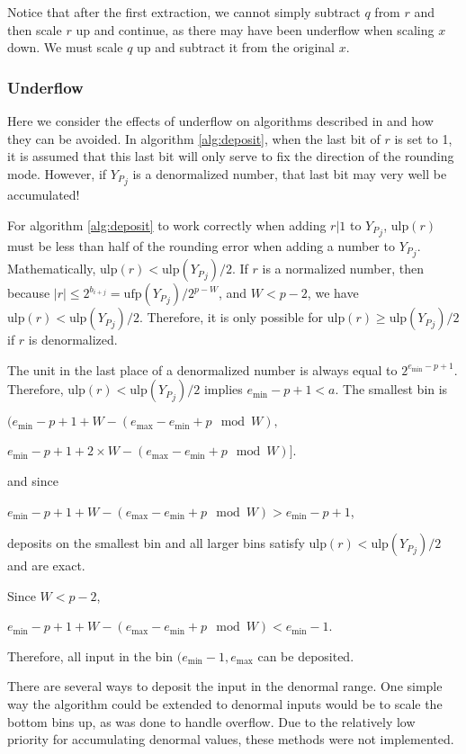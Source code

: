 \documentclass[12pt]{article}
\providecommand{\min}{\ensuremath{\text{min}}}
\providecommand{\max}{\ensuremath{\text{max}}}
\providecommand{\ulp}{\ensuremath{\text{ulp}}}
\providecommand{\ufp}{\ensuremath{\text{ufp}}}
\theoremstyle{plain}
\begin{document}
      Notice that after the first extraction, we cannot simply subtract $q$ from $r$ and then scale $r$ up and continue, as there may have been underflow when scaling $x$ down. We must scale $q$ up and subtract it from the original $x$.

    \subsubsection{Underflow}
      \label{sec:underflow}
      Here we consider the effects of underflow on algorithms described in \cite{repsum} and how they can be avoided. In algorithm \ref{alg:deposit}, when the last bit of $r$ is set to 1, it is assumed that this last bit will only serve to fix the direction of the rounding mode. However, if ${Y_P}_j$ is a denormalized number, that last bit may very well be accumulated!

      For algorithm \ref{alg:deposit} to work correctly when adding $r | 1$ to ${Y_P}_j$, $\ulp(r)$ must be less than half of the rounding error when adding a number to ${Y_P}_j$. Mathematically, $\ulp(r) < \ulp({Y_P}_j)/2$.
      If $r$ is a normalized number, then because $|r| \leq 2^{b_{i + j}} = \ufp({Y_P}_j)/2^{p - W}$, and $W < p - 2$, we have $\ulp(r) < \ulp({Y_P}_j)/2$. Therefore, it is only possible for $\ulp(r) \geq \ulp({Y_P}_j)/2$ if $r$ is denormalized.

      The unit in the last place of a denormalized number is always equal to $2^{e_{\min} - p + 1}$. Therefore, $\ulp(r) < \ulp({Y_P}_j)/2$ implies $e_{\min} - p + 1 < a$. The smallest bin is

      $(e_{\min} - p + 1 + W - (e_{\max} - e_{\min} + p \mod W),$

      \indent \indent $e_{\min} - p + 1 + 2 \times W - (e_{\max} - e_{\min} + p \mod W)]$.

      and since

      $e_{\min} - p + 1 + W - (e_{\max} - e_{\min} + p \mod W) > e_{\min} - p + 1$,

      deposits on the smallest bin and all larger bins satisfy $\ulp(r) < \ulp({Y_P}_j)/2$ and are exact.

      Since $W < p - 2$,

      $e_{\min} - p + 1 + W - (e_{\max} - e_{\min} + p \mod W) < e_{\min} - 1$.

      Therefore, all input in the bin $(e_{\min} - 1, e_{\max}$ can be deposited.

      There are several ways to deposit the input in the denormal range. One simple way the algorithm could be extended to denormal inputs would be to scale the bottom bins up, as was done to handle overflow. Due to the relatively low priority for accumulating denormal values, these methods were not implemented.
\end{document}
